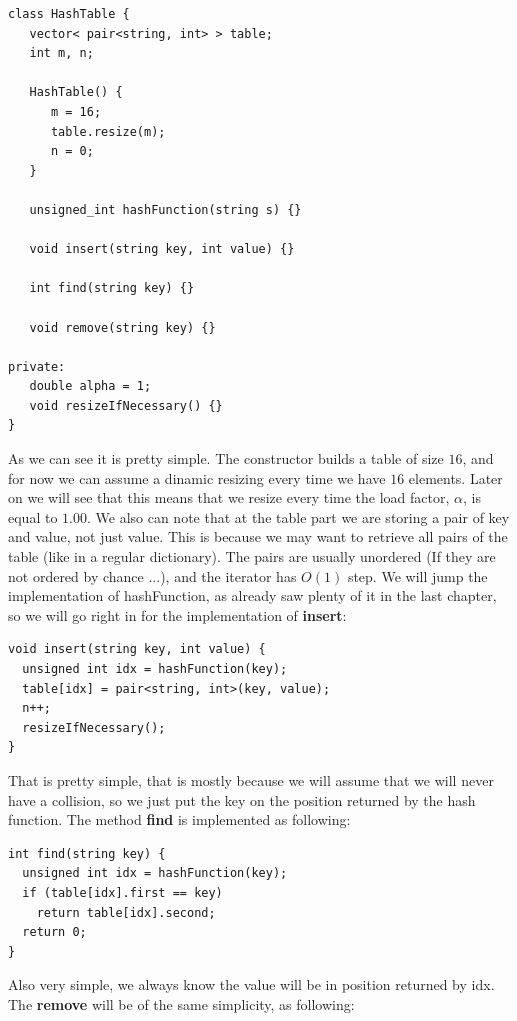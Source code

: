 \begin{lstlisting}
class HashTable {
   vector< pair<string, int> > table;
   int m, n;
   
   HashTable() {
      m = 16;
      table.resize(m);
      n = 0;
   }

   unsigned_int hashFunction(string s) {}
   
   void insert(string key, int value) {}

   int find(string key) {}

   void remove(string key) {}

private:
   double alpha = 1;
   void resizeIfNecessary() {}
}
\end{lstlisting}

As we can see it is pretty simple. The constructor builds a table of size \( 16 \), and for now we can assume a dinamic resizing every time we have \( 16 \) elements. Later on we will see that this means that we resize every time the load factor, \( \alpha \), is equal to \( 1.00 \). We also can note that at the table part we are storing a pair of key and value, not just value. This is because we may want to retrieve all pairs of the table (like in a regular dictionary). The pairs are usually unordered (If they are not ordered by chance ...), and the iterator has \( O(1) \) step. We will jump the implementation of hashFunction, as already saw plenty of it in the last chapter, so we will go right in for the implementation of \textbf{insert}:

\begin{lstlisting}
void insert(string key, int value) {
  unsigned int idx = hashFunction(key);
  table[idx] = pair<string, int>(key, value);
  n++;
  resizeIfNecessary();
}
\end{lstlisting}

That is pretty simple, that is mostly because we will assume that we will never have a collision, so we just put the key on the position returned by the hash function. The method \textbf{find} is implemented as following:

\begin{lstlisting}
int find(string key) {
  unsigned int idx = hashFunction(key);
  if (table[idx].first == key)
    return table[idx].second;
  return 0;
}
\end{lstlisting}

Also very simple, we always know the value will be in position returned by idx. The \textbf{remove} will be of the same simplicity, as following:

